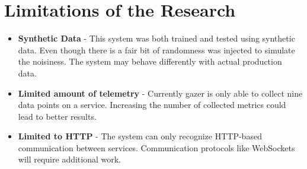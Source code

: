 \section{Limitations of the Research}

\begin{itemize}[noitemsep,nolistsep]
    \item \textbf{Synthetic Data} - This system was both trained and tested using synthetic data. Even though there is a fair bit of randomness was injected to simulate the noisiness. The system may behave differently with actual production data.
    \item \textbf{Limited amount of telemetry} - Currently \ac{gazer} is only able to collect nine data points on a service. Increasing the number of collected metrics could lead to better results.
    \item \textbf{Limited to HTTP} - The system can only recognize HTTP-based communication between services. Communication protocols like WebSockets will require additional work.
\end{itemize}